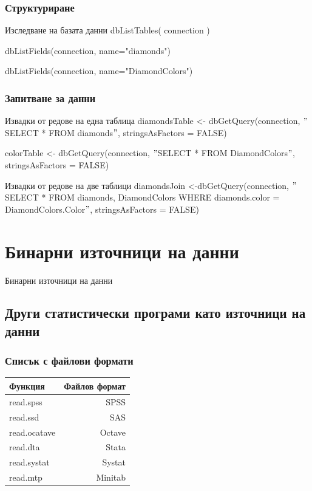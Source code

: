 \documentclass{beamer}
\begin{document}
\begin{frame}
\frametitle{Структуриране}
\begin{block}{Изследване на базата данни}
dbListTables( connection )

dbListFields(connection, name="diamonds")

dbListFields(connection, name="DiamondColors")
\end{block}
\end{frame}

\begin{frame}
\frametitle{Запитване за данни}
\begin{block}{Извадки от редове на една таблица}
diamondsTable <- dbGetQuery(connection, $"$SELECT * FROM diamonds$"$, stringsAsFactors = FALSE)

colorTable <- dbGetQuery(connection, $"$SELECT * FROM DiamondColors$"$, stringsAsFactors = FALSE)
\end{block}

\begin{block}{Извадки от редове на две таблици}
diamondsJoin <-dbGetQuery(connection, $"$SELECT * FROM diamonds, DiamondColors WHERE diamonds.color = DiamondColors.Color$"$, stringsAsFactors = FALSE)
\end{block}
\end{frame}

\section{Бинарни източници на данни}

\begin{frame}
\center \huge{Бинарни източници на данни}
\end{frame}

\subsection{Други статистически програми като източници на данни}

\begin{frame}
\frametitle{Списък с файлови формати}
\begin{table}[ht]
\centering
\begin{tabular}{|l|r|} 
 \hline
  Функция & Файлов формат \\ [0.1ex] 
  \hline\hline
  read.spss & SPSS \\
  \hline
  read.ssd & SAS \\
  \hline
  read.ocatave & Octave \\
  \hline
  read.dta & Stata \\
  \hline
  read.systat & Systat \\
  \hline
  read.mtp & Minitab \\
  \hline
\end{tabular}
\end{table}
\end{frame}
\end{document}
